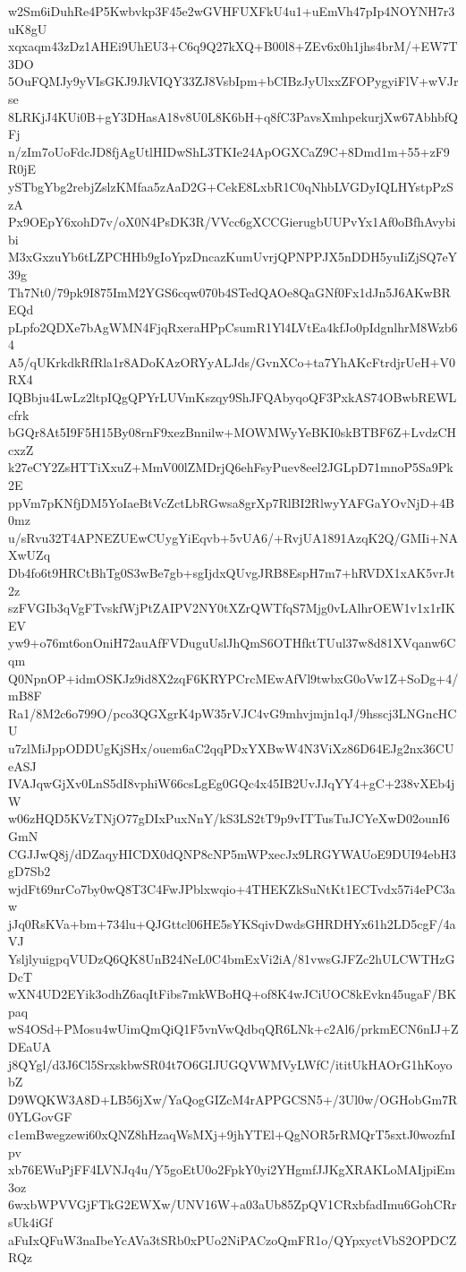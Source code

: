 w2Sm6iDuhRe4P5Kwbvkp3F45e2wGVHFUXFkU4u1+uEmVh47pIp4NOYNH7r3uK8gU
xqxaqm43zDz1AHEi9UhEU3+C6q9Q27kXQ+B00l8+ZEv6x0h1jhs4brM/+EW7T3DO
5OuFQMJy9yVIsGKJ9JkVIQY33ZJ8VsbIpm+bCIBzJyUlxxZFOPygyiFlV+wVJrse
8LRKjJ4KUi0B+gY3DHasA18v8U0L8K6bH+q8fC3PavsXmhpekurjXw67AbhbfQFj
n/zIm7oUoFdcJD8fjAgUtlHIDwShL3TKIe24ApOGXCaZ9C+8Dmd1m+55+zF9R0jE
ySTbgYbg2rebjZslzKMfaa5zAaD2G+CekE8LxbR1C0qNhbLVGDyIQLHYstpPzSzA
Px9OEpY6xohD7v/oX0N4PsDK3R/VVcc6gXCCGierugbUUPvYx1Af0oBfhAvybibi
M3xGxzuYb6tLZPCHHb9gIoYpzDncazKumUvrjQPNPPJX5nDDH5yuIiZjSQ7eY39g
Th7Nt0/79pk9I875ImM2YGS6cqw070b4STedQAOe8QaGNf0Fx1dJn5J6AKwBREQd
pLpfo2QDXe7bAgWMN4FjqRxeraHPpCsumR1Yl4LVtEa4kfJo0pIdgnlhrM8Wzb64
A5/qUKrkdkRfRla1r8ADoKAzORYyALJds/GvnXCo+ta7YhAKcFtrdjrUeH+V0RX4
IQBbju4LwLz2ltpIQgQPYrLUVmKszqy9ShJFQAbyqoQF3PxkAS74OBwbREWLcfrk
bGQr8At5I9F5H15By08rnF9xezBnnilw+MOWMWyYeBKI0skBTBF6Z+LvdzCHcxzZ
k27eCY2ZsHTTiXxuZ+MmV00lZMDrjQ6ehFsyPuev8eel2JGLpD71mnoP5Sa9Pk2E
ppVm7pKNfjDM5YoIaeBtVcZctLbRGwsa8grXp7RlBI2RlwyYAFGaYOvNjD+4B0mz
u/sRvu32T4APNEZUEwCUygYiEqvb+5vUA6/+RvjUA1891AzqK2Q/GMIi+NAXwUZq
Db4fo6t9HRCtBhTg0S3wBe7gb+sgIjdxQUvgJRB8EspH7m7+hRVDX1xAK5vrJt2z
szFVGIb3qVgFTvskfWjPtZAIPV2NY0tXZrQWTfqS7Mjg0vLAlhrOEW1v1x1rIKEV
yw9+o76mt6onOniH72auAfFVDuguUslJhQmS6OTHfktTUul37w8d81XVqanw6Cqm
Q0NpnOP+idmOSKJz9id8X2zqF6KRYPCrcMEwAfVl9twbxG0oVw1Z+SoDg+4/mB8F
Ra1/8M2c6o799O/pco3QGXgrK4pW35rVJC4vG9mhvjmjn1qJ/9hsscj3LNGncHCU
u7zlMiJppODDUgKjSHx/ouem6aC2qqPDxYXBwW4N3ViXz86D64EJg2nx36CUeASJ
IVAJqwGjXv0LnS5dI8vphiW66csLgEg0GQc4x45IB2UvJJqYY4+gC+238vXEb4jW
w06zHQD5KVzTNjO77gDIxPuxNnY/kS3LS2tT9p9vITTusTuJCYeXwD02ounI6GmN
CGJJwQ8j/dDZaqyHICDX0dQNP8cNP5mWPxecJx9LRGYWAUoE9DUI94ebH3gD7Sb2
wjdFt69nrCo7by0wQ8T3C4FwJPblxwqio+4THEKZkSuNtKt1ECTvdx57i4ePC3aw
jJq0RsKVa+bm+734lu+QJGttcl06HE5sYKSqivDwdsGHRDHYx61h2LD5cgF/4aVJ
YsljlyuigpqVUDzQ6QK8UnB24NeL0C4bmExVi2iA/81vwsGJFZc2hULCWTHzGDcT
wXN4UD2EYik3odhZ6aqItFibs7mkWBoHQ+of8K4wJCiUOC8kEvkn45ugaF/BKpaq
wS4OSd+PMosu4wUimQmQiQ1F5vnVwQdbqQR6LNk+c2Al6/prkmECN6nIJ+ZDEaUA
j8QYgl/d3J6Cl5SrxskbwSR04t7O6GIJUGQVWMVyLWfC/ititUkHAOrG1hKoyobZ
D9WQKW3A8D+LB56jXw/YaQogGIZcM4rAPPGCSN5+/3Ul0w/OGHobGm7R0YLGovGF
c1emBwegzewi60xQNZ8hHzaqWsMXj+9jhYTEl+QgNOR5rRMQrT5sxtJ0wozfnIpv
xb76EWuPjFF4LVNJq4u/Y5goEtU0o2FpkY0yi2YHgmfJJKgXRAKLoMAIjpiEm3oz
6wxbWPVVGjFTkG2EWXw/UNV16W+a03aUb85ZpQV1CRxbfadImu6GohCRrsUk4iGf
aFuIxQFuW3naIbeYcAVa3tSRb0xPUo2NiPACzoQmFR1o/QYpxyctVbS2OPDCZRQz
